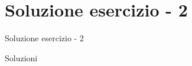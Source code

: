 \section{Soluzione esercizio - 2}
  \begin{frame}{Soluzione esercizio - 2}

    \begin{exampleblock}{Soluzioni}
      
    \end{exampleblock}

\end{frame}
